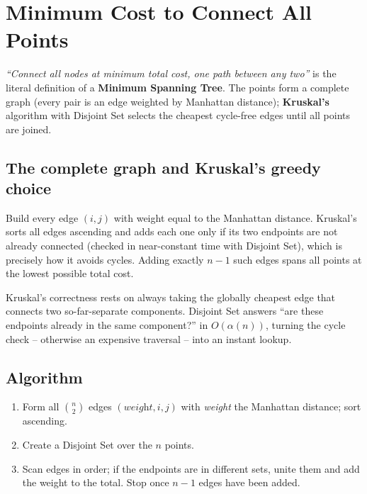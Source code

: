 \section{Minimum Cost to Connect All Points}
\label{sec:graph-min-cost-connect}


\begin{patternbox}
\emph{``Connect all nodes at minimum total cost, one path between
any two''} is the literal definition of a \textbf{Minimum Spanning
Tree}. The points form a complete graph (every pair is an edge weighted
by Manhattan distance); \textbf{Kruskal's} algorithm with Disjoint Set
selects the cheapest cycle-free edges until all points are joined.
\end{patternbox}

\subsection*{The complete graph and Kruskal's greedy choice}

Build every edge $(i,j)$ with weight equal to the Manhattan distance.
Kruskal's sorts all edges ascending and adds each one only if its two
endpoints are not already connected (checked in near-constant time with
Disjoint Set), which is precisely how it avoids cycles. Adding exactly
$n-1$ such edges spans all points at the lowest possible total cost.

\begin{ideabox}
Kruskal's correctness rests on always taking the globally cheapest
edge that connects two so-far-separate components. Disjoint Set answers
``are these endpoints already in the same component?'' in
$O(\alpha(n))$, turning the cycle check -- otherwise an expensive
traversal -- into an instant lookup.
\end{ideabox}

\subsection*{Algorithm}

\begin{enumerate}
  \item Form all $\binom{n}{2}$ edges $(\textit{weight}, i, j)$ with
        \textit{weight} the Manhattan distance; sort ascending.
  \item Create a Disjoint Set over the $n$ points.
  \item Scan edges in order; if the endpoints are in different sets,
        unite them and add the weight to the total. Stop once $n-1$
        edges have been added.
\end{enumerate}

